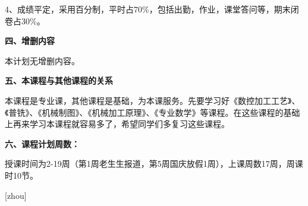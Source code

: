 \documentclass{ctexart}
\begin{document}
4、成绩平定，采用百分制，平时占70\%，包括出勤，作业，课堂答问等，期末闭卷占30\%。

\textbf{四、增删内容}

本计划无增删内容。

\textbf{五、本课程与其他课程的关系}

本课程是专业课，其他课程是基础，为本课服务。先要学习好《数控加工工艺》、《普铣》、《机械制图》、《机械加工原理》、《专业数学》等课程。在这些课程的基础上再来学习本课程就容易多了，希望同学们多复习这些课程。

\textbf{六、课程计划周数：}

授课时间为2-19周（第1周老生生报道，第5周国庆放假1周），上课周数17周，周课时10节。

\onecolumn \setlength{\parindent}{0em}

\setcounter{lilunN}{0} %

\newcommand{\llh}{ \stepcounter{lilunN} 理论\arabic{lilunN}、} %
\newcommand{\syt}{ 自绘示意图\arabic{lilunN} }%
\newcommand{\xt}{ 习题\arabic{lilunN} }%

 \setcounter{zhou}{0}%
 [zhou] \setcounter{ci}{0}%
\newcommand{\zc}{\ifthenelse{ \not \isodd{\value{ci}}}{\stepcounter{zhou}\setcounter{ci}{0}}{} \stepcounter{ci} \arabic{zhou}/\arabic{ci}} %
\newcommand{\zcd}{\stepcounter{zhou} \arabic{zhou}} %
\end{document}
